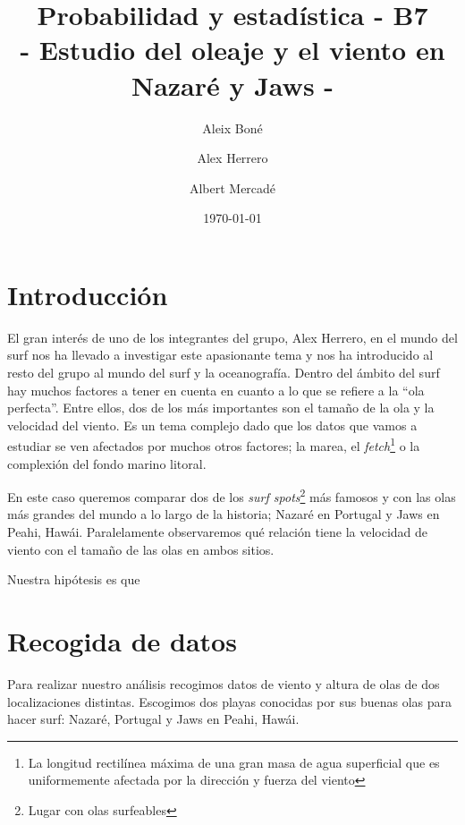 


\title{
   Probabilidad y estadística - B7 \\
   \large 
   - Estudio del oleaje y el viento en Nazaré y Jaws -
}
\author{
  Aleix Boné \and
  Alex Herrero \and
  Albert Mercadé
}
\date{
  \today
}


\maketitle

\begin{abstract}
\end{abstract}

\section{Introducción}%
\label{sec:introduccion}
El gran interés de uno de los integrantes del grupo, Alex Herrero, en el mundo del surf nos ha llevado a investigar este apasionante tema y nos ha introducido al resto del grupo al mundo del surf y la oceanografía. Dentro del ámbito del surf hay muchos factores a tener en cuenta en cuanto a lo que se refiere a la ``ola perfecta''. Entre ellos, dos de los más importantes son el tamaño de la ola y la velocidad del viento. Es un tema complejo dado que los datos que vamos a estudiar se ven afectados por muchos otros factores; la marea, el \textit{fetch}\footnote{La longitud rectilínea máxima de una gran masa de agua superficial que es uniformemente afectada por la dirección y fuerza del viento} o la complexión del fondo marino litoral.

En este caso queremos comparar dos de los \textit{surf spots}\footnote{Lugar con olas surfeables} más famosos y con las olas más grandes del mundo a lo largo de la historia; Nazaré en Portugal y Jaws en Peahi, Hawái. Paralelamente observaremos qué relación tiene la velocidad de viento con el tamaño de las olas en ambos sitios.

Nuestra hipótesis es que 

\section{Recogida de datos}%
\label{sec:recogida_de_datos}

Para realizar nuestro análisis recogimos datos de viento y altura de olas de
dos localizaciones distintas. Escogimos dos playas conocidas por sus buenas
olas para hacer surf: Nazaré, Portugal y Jaws en Peahi, Hawái.

